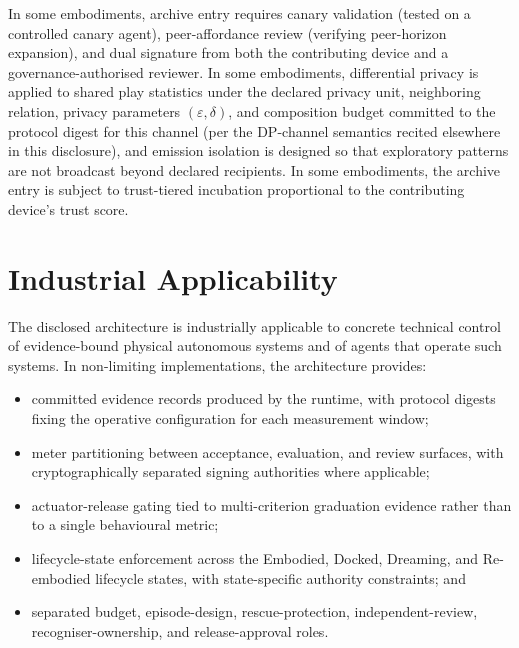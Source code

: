 \documentclass[a4paper,12pt]{article}
\begin{document}
In some embodiments, archive entry requires canary validation (tested
on a controlled canary agent), peer-affordance review (verifying
peer-horizon expansion), and dual signature from both the contributing
device and a governance-authorised reviewer. In some embodiments, differential privacy is applied to shared play statistics under the declared privacy unit, neighboring relation, privacy parameters $(\varepsilon, \delta)$, and composition budget committed to the protocol digest for this channel (per the DP-channel semantics recited elsewhere in this disclosure), and emission isolation is designed so that exploratory patterns are not broadcast beyond declared recipients. In some embodiments, the archive entry is
subject to trust-tiered incubation proportional to the contributing
device's trust score.

\section{Industrial Applicability}


The disclosed architecture is industrially applicable to concrete
technical control of evidence-bound physical autonomous systems
and of agents that operate such systems. In non-limiting
implementations, the architecture provides:

\begin{itemize}
  \item committed evidence records produced by the runtime, with
        protocol digests fixing the operative configuration for each
        measurement window;
  \item meter partitioning between acceptance, evaluation, and
        review surfaces, with cryptographically separated signing
        authorities where applicable;
  \item actuator-release gating tied to multi-criterion graduation
        evidence rather than to a single behavioural metric;
  \item lifecycle-state enforcement across the Embodied, Docked,
        Dreaming, and Re-embodied lifecycle states, with
        state-specific authority constraints; and
  \item separated budget, episode-design, rescue-protection,
        independent-review, recogniser-ownership, and
        release-approval roles.
\end{itemize}
\end{document}
